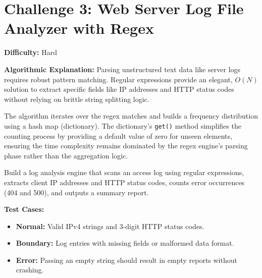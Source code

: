 \section{Challenge 3: Web Server Log File Analyzer with Regex}

\textbf{Difficulty:} Hard

\textbf{Algorithmic Explanation:}
Parsing unstructured text data like server logs requires robust pattern matching. Regular expressions provide an elegant, $O(N)$ solution to extract specific fields like IP addresses and HTTP status codes without relying on brittle string splitting logic. 

The algorithm iterates over the regex matches and builds a frequency distribution using a hash map (dictionary). The dictionary's \texttt{get()} method simplifies the counting process by providing a default value of zero for unseen elements, ensuring the time complexity remains dominated by the regex engine's parsing phase rather than the aggregation logic.

\begin{practiceset}
Build a log analysis engine that scans an access log using regular expressions, extracts client IP addresses and HTTP status codes, counts error occurrences (404 and 500), and outputs a summary report.

\textbf{Test Cases:}
\begin{itemize}
    \item \textbf{Normal:} Valid IPv4 strings and 3-digit HTTP status codes.
    \item \textbf{Boundary:} Log entries with missing fields or malformed data format.
    \item \textbf{Error:} Passing an empty string should result in empty reports without crashing.
\end{itemize}
\end{practiceset}

